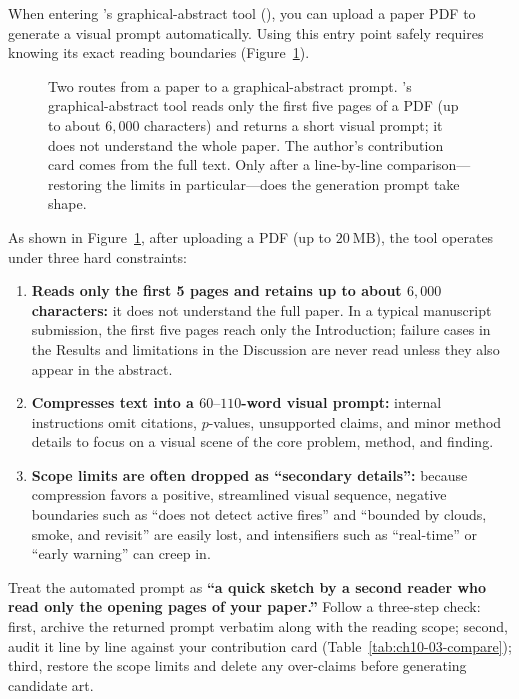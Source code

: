 When entering \scidraw{}'s graphical-abstract tool (), you can upload a paper PDF to generate a visual prompt automatically. Using this entry point safely requires knowing its exact reading boundaries (Figure~\ref{fig:ch10-02}).

\begin{figure}[htbp]\centering
\resizebox{\linewidth}{!}{}
\caption{Two routes from a paper to a graphical-abstract prompt. \scidraw{}'s graphical-abstract tool reads only the first five pages of a PDF (up to about $6{,}000$ characters) and returns a short visual prompt; it does not understand the whole paper. The author's contribution card comes from the full text. Only after a line-by-line comparison---restoring the limits in particular---does the generation prompt take shape.}\label{fig:ch10-02}
\end{figure}

As shown in Figure~\ref{fig:ch10-02}, after uploading a PDF (up to $20\ \text{MB}$), the tool operates under three hard constraints:
\begin{enumerate}
\item \textbf{Reads only the first 5 pages and retains up to about $6{,}000$ characters:} it does not understand the full paper. In a typical manuscript submission, the first five pages reach only the Introduction; failure cases in the Results and limitations in the Discussion are never read unless they also appear in the abstract.
\item \textbf{Compresses text into a $60\text{--}110$-word visual prompt:} internal instructions omit citations, $p$-values, unsupported claims, and minor method details to focus on a visual scene of the core problem, method, and finding.
\item \textbf{Scope limits are often dropped as ``secondary details'':} because compression favors a positive, streamlined visual sequence, negative boundaries such as ``does not detect active fires'' and ``bounded by clouds, smoke, and revisit'' are easily lost, and intensifiers such as ``real-time'' or ``early warning'' can creep in.
\end{enumerate}

Treat the automated prompt as \textbf{``a quick sketch by a second reader who read only the opening pages of your paper.''} Follow a three-step check: first, archive the returned prompt verbatim along with the reading scope; second, audit it line by line against your contribution card (Table~\ref{tab:ch10-03-compare}); third, restore the scope limits and delete any over-claims before generating candidate art.

